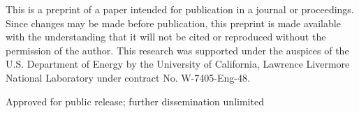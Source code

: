 {This is a preprint of a paper intended for publication in a journal or proceedings. Since
changes may be made before publication, this preprint is made available with the
understanding that it will not be cited or reproduced without the permission of the
author.
\baselineskip
This research was supported under the auspices of the U.S. Department of Energy by
the University of California, Lawrence Livermore National Laboratory under
contract No.  W-7405-Eng-48.
\vfill
\begin{center}
Approved for public release; further dissemination unlimited
\end{center}
\clearpage
\changetext{-.625in}{}{}{}{}
\resetPageFromLLNLCover
\setcounter{page}{1}
}


\newcommand{\makeLLNLBackCover}{%
\clearpage
\setPageForLLNLBackCover
\changetext{.625in}{}{}{}{}
\thispagestyle{empty}%
\ \ 
\vfill
\begin{center}
Approved for public release; further dissemination unlimited
\end{center}
\clearpage 
\clearpage
\changetext{-.625in}{}{}{}{}
\thispagestyle{empty}%
\renewcommand{\logoWidth}{10.in}
\begin{pspicture}(0,0)(17,24.)
\rput{90}(2.3,11.5){\epsfig{file=Rule_and_address.ps,width=\logoWidth}}
\end{pspicture}
\clearpage
\resetPageFromLLNLCover
}




